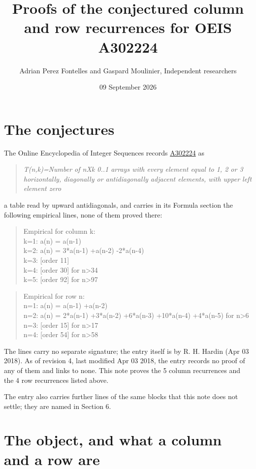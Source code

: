 \documentclass[11pt]{article}
\title{Proofs of the conjectured column and row recurrences for OEIS A302224}
\author{Adrian Perez Fontelles and Gaspard Moulinier, Independent researchers}
\date{09 September 2026}
\theoremstyle{definition}
\begin{document}
\maketitle
\section{The conjectures}

The Online Encyclopedia of Integer Sequences records \href{https://oeis.org/A302224}{A302224} as

\begin{quote}\itshape T(n,k)=Number of nXk 0..1 arrays with every element equal to 1, 2 or 3 horizontally, diagonally or antidiagonally adjacent elements, with upper left element zero\end{quote}

a table read by upward antidiagonals, and carries in its Formula section the following empirical lines, none of them proved there:

\begin{quote}\ttfamily Empirical for column k:\\
k=1: a(n) = a(n-1)\\k=2: a(n) = 3*a(n-1) +a(n-2) -2*a(n-4)\\k=3: [order 11]\\k=4: [order 30] for n>34\\k=5: [order 92] for n>97\end{quote}

\begin{quote}\ttfamily Empirical for row n:\\
n=1: a(n) = a(n-1) +a(n-2)\\n=2: a(n) = 2*a(n-1) +3*a(n-2) +6*a(n-3) +10*a(n-4) +4*a(n-5) for n>6\\n=3: [order 15] for n>17\\n=4: [order 54] for n>58\end{quote}

The lines carry no separate signature; the entry itself is by R. H. Hardin (Apr 03 2018). As of revision 4, last modified Apr 03 2018, the entry records no proof of any of them and links to none. This note proves the 5 column recurrences and the 4 row recurrences listed above.

The entry also carries further lines of the same blocks that this note does not settle; they are named in Section 6.

\section{The object, and what a column and a row are}
\end{document}
